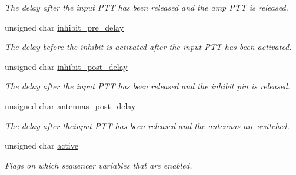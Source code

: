 \begin{CompactItemize}
\begin{CompactList}\small\item\em The delay after the input PTT has been released and the amp PTT is released. \item\end{CompactList}\item 
\hypertarget{structstruct__ptt__sequencer_239dddd85cd4a89a9fdbc2653fbcacd1}{
unsigned char \hyperlink{structstruct__ptt__sequencer_239dddd85cd4a89a9fdbc2653fbcacd1}{inhibit\_\-pre\_\-delay}}
\label{structstruct__ptt__sequencer_239dddd85cd4a89a9fdbc2653fbcacd1}

\begin{CompactList}\small\item\em The delay before the inhibit is activated after the input PTT has been activated. \item\end{CompactList}\item 
\hypertarget{structstruct__ptt__sequencer_919ecd74b5a2275ad15bc79f28cf2e8d}{
unsigned char \hyperlink{structstruct__ptt__sequencer_919ecd74b5a2275ad15bc79f28cf2e8d}{inhibit\_\-post\_\-delay}}
\label{structstruct__ptt__sequencer_919ecd74b5a2275ad15bc79f28cf2e8d}

\begin{CompactList}\small\item\em The delay after the input PTT has been released and the inhibit pin is released. \item\end{CompactList}\item 
\hypertarget{structstruct__ptt__sequencer_d35cc48fb05bb8c1da7c8e19759d2066}{
unsigned char \hyperlink{structstruct__ptt__sequencer_d35cc48fb05bb8c1da7c8e19759d2066}{antennas\_\-post\_\-delay}}
\label{structstruct__ptt__sequencer_d35cc48fb05bb8c1da7c8e19759d2066}

\begin{CompactList}\small\item\em The delay after theinput PTT has been released and the antennas are switched. \item\end{CompactList}\item 
\hypertarget{structstruct__ptt__sequencer_5fa1f5b6c64fa66ea64ddedcc2059fbc}{
unsigned char \hyperlink{structstruct__ptt__sequencer_5fa1f5b6c64fa66ea64ddedcc2059fbc}{active}}
\label{structstruct__ptt__sequencer_5fa1f5b6c64fa66ea64ddedcc2059fbc}

\begin{CompactList}\small\item\em Flags on which sequencer variables that are enabled. \item\end{CompactList}\end{CompactItemize}


